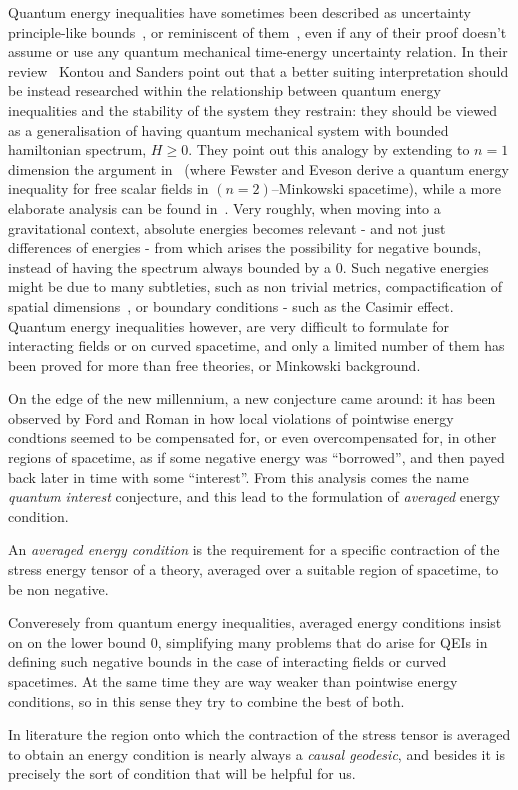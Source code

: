 Quantum energy inequalities have sometimes been described as uncertainty principle-like bounds~\cite[]{ford1998quantum}, or reminiscent of them~\cite[]{fewster1999bounds}, even if any of their proof doesn't assume or use any quantum mechanical time-energy uncertainty relation.
In their review~\cite[]{kontou2020energy} Kontou and Sanders point out that a better suiting interpretation should be instead researched within the relationship between quantum energy inequalities and the stability of the system they restrain: they should be viewed as a generalisation of having quantum mechanical system with bounded hamiltonian spectrum, \(H \ge 0\). They point out this analogy by extending to \(n = 1\) dimension the argument in~\cite[]{fewster1998bounds} (where Fewster and Eveson derive a quantum energy inequality for free scalar fields in \((n = 2)\)--Minkowski spacetime), while a more elaborate analysis can be found in~\cite[]{fewster2003stability}. Very roughly, when moving into a gravitational context, absolute energies becomes relevant - and not just differences of energies - from which arises the possibility for negative bounds, instead of having the spectrum always bounded by a \(0\). Such negative energies might be due to many subtleties, such as non trivial metrics, compactification of spatial dimensions~\cite[]{banach1979vacuum, louko1998inextendible}, or boundary conditions - such as the Casimir effect. Quantum energy inequalities however, are very difficult to formulate for interacting fields or on curved spacetime, and only a limited number of them has been proved for more than free theories, or Minkowski background. 

On the edge of the new millennium, a new conjecture came around: it has been observed by Ford and Roman in \cite[]{ford1999quantum} how local violations of pointwise energy condtions seemed to be compensated for, or even overcompensated for, in other regions of spacetime, as if some negative energy was ``borrowed'', and then payed back later in time with some ``interest''. From this analysis comes the name \emph{quantum interest} conjecture, and this lead to the formulation of \emph{averaged} energy condition.
\begin{definition}
    An \emph{averaged energy condition} is the requirement for a specific contraction of the stress energy tensor of a theory, averaged over a suitable region of spacetime, to be non negative.
\end{definition}
\begin{remark}
    Converesely from quantum energy inequalities, averaged energy conditions insist on on the lower bound \(0\), simplifying many problems that do arise for QEIs in defining such negative bounds in the case of interacting fields or curved spacetimes. At the same time they are way weaker than pointwise energy conditions, so in this sense they try to combine the best of both.
\end{remark}
In literature the region onto which the contraction of the stress tensor is averaged to obtain an energy condition is nearly always a \emph{causal geodesic}, and besides it is precisely the sort of condition that will be helpful for us.

